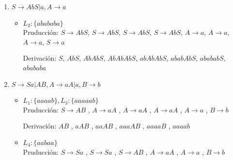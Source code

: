 \documentclass{article}
\begin{document}
    
        \begin{enumerate}
        
            \item   $S \to AbS|a, A \to a$
                \begin{itemize}
                    \item $ L_2 : \{abababa\}$ \\
                        Pruducción:
                        $ S \to AbS $,
                        $ S \to AbS $,
                        $ S \to AbS $,
                        $ S \to AbS $,
                        $ A \to a $,
                        $ A \to a $,
                        $ A \to a $,
                        $ S \to a $ 
                        
                        Derivación: 
                        $ S $,
                        $ AbS $,
                        $ AbAbS $,
                        $ AbAbAbS $,
                        $ abAbAbS $,
                        $ ababAbS $,
                        $ abababS $,
                        $ abababa $
                \end{itemize}                
                    
                    
            
            \item   $S \to Sa|AB, A \to aA|a, B \to b$
                \begin{itemize}
                    \item $ L_1 : \{aaaab\},  L_3 : \{aaaaab\}$ \\
                        Pruducción:
                        $ S \to AB $ ,
                        $ A \to aA $ ,
                        $ A \to aA $ ,
                        $ A \to aA $ ,
                        $ A \to a $ ,
                        $ B \to b $
                        
                        Derivación: 
                        $ AB $ ,
                        $ aAB $ ,
                        $ aaAB $ ,
                        $ aaaAB $ ,
                        $ aaaaB $ ,
                        $ aaaab $ 
                        
                    \item $ L_4 : \{aabaa\}$ \\
                        Pruducción:
                        $ S \to Sa $ ,
                        $ S \to Sa $ ,
                        $ S \to AB $ ,
                        $ A \to aA $ ,
                        $ A \to a $ ,
                        $ B \to b $
                        

\end{itemize}
\end{enumerate}
\end{document}
